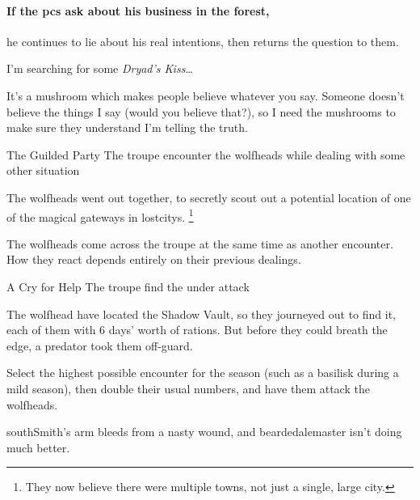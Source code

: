 \southSmith
\label{southSmith}

\paragraph{If the \glspl{pc} ask  about his business in the forest,}
he continues to lie about his real intentions, then returns the question to them.

\begin{speechtext}
  I'm searching for some \textit{Dryad's Kiss}\ldots

  It's a mushroom which makes people believe whatever you say.
  Someone doesn't believe the things I say (would you believe that?), so I need the mushrooms to make sure they understand I'm telling the truth.
\end{speechtext}

{\squash The Guilded Party}%
{The troupe encounter the \glspl{wolfhead} while dealing with some other situation}%

\begin{exampletext}
  The \glspl{wolfhead} went out together, to secretly scout out a potential location of one of the magical gateways in \glspl{lostcity}.%
  \footnote{They now believe there were multiple towns, not just a single, large city.}
\end{exampletext}

The \glspl{wolfhead} come across the troupe at the same time as another encounter.
How they react depends entirely on their previous dealings.

{A Cry for Help}%
{The troupe find the  under attack}%

The \gls{wolfhead} have located the Shadow Vault, so they journeyed out to find it, each of them with 6 days' worth of rations.
But before they could breath the \gls{edge}, a predator took them off-guard.

Select the highest possible encounter for the season (such as a basilisk during a mild season), then double their usual numbers, and have them attack the \glspl{wolfhead}.



\Gls{southSmith}'s arm bleeds from a nasty wound, and \gls{beardedalemaster} isn't doing much better.


